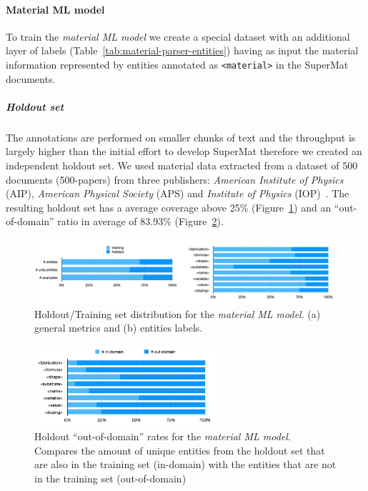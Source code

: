 \documentclass{article}
\begin{document}
\paragraph{Material ML model}

To train the \textit{material ML model} we create a special dataset with an additional layer of labels (Table~\ref{tab:material-parser-entities}) having as input the material information represented by entities annotated as \texttt{<material>} in the SuperMat documents.

\subparagraph{Holdout set}
The annotations are performed on smaller chunks of text and the throughput is largely higher than the initial effort to develop SuperMat therefore we created an independent holdout set. 
We used material data extracted from a dataset of 500 documents (500-papers) from three publishers: \textit{American Institute of Physics} (AIP), \textit{American Physical Society} (APS) and \textit{Institute of Physics} (IOP)~\cite{foppiano2019proposal}.
The resulting holdout set has a average coverage above 25\% (Figure~\ref{fig:material-training-holdout-set-distribution}) and an ``out-of-domain'' ratio in average of 83.93\% (Figure~\ref{fig:material-out-domain-holdout}). 

\begin{figure}[ht]
\centering
\includegraphics[width=\textwidth]{material-holdout-training-set}
\caption{Holdout/Training set distribution for the \textit{material ML model}. (a) general metrics and (b) entities labels.}
\label{fig:material-training-holdout-set-distribution}
\end{figure}

\begin{figure}[ht]
\centering
\includegraphics[width=0.6\textwidth]{material-out-domain-holdout-unique}
\caption{Holdout ``out-of-domain'' rates for the \textit{material ML model}. Compares the amount of unique entities from the holdout set that are also in the training set (in-domain) with the entities that are not in the training set (out-of-domain)}
\label{fig:material-out-domain-holdout}
\end{figure}
\end{document}

